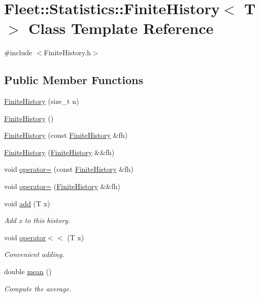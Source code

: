 \hypertarget{class_fleet_1_1_statistics_1_1_finite_history}{}\section{Fleet\+:\+:Statistics\+:\+:Finite\+History$<$ T $>$ Class Template Reference}
\label{class_fleet_1_1_statistics_1_1_finite_history}


{\ttfamily \#include $<$Finite\+History.\+h$>$}

\subsection*{Public Member Functions}
\begin{DoxyCompactItemize}
\item 
\hyperlink{class_fleet_1_1_statistics_1_1_finite_history_a14ef23d9161c620fa8dce3c42ce08220}{Finite\+History} (size\+\_\+t n)
\item 
\hyperlink{class_fleet_1_1_statistics_1_1_finite_history_ae4ca3e409992b855cef8e9430a216481}{Finite\+History} ()
\item 
\hyperlink{class_fleet_1_1_statistics_1_1_finite_history_a7c94246e763c8f3533a5aeecb3d74997}{Finite\+History} (const \hyperlink{class_fleet_1_1_statistics_1_1_finite_history}{Finite\+History} \&fh)
\item 
\hyperlink{class_fleet_1_1_statistics_1_1_finite_history_a60518d678c82115b004bbc8c319e8a63}{Finite\+History} (\hyperlink{class_fleet_1_1_statistics_1_1_finite_history}{Finite\+History} \&\&fh)
\item 
void \hyperlink{class_fleet_1_1_statistics_1_1_finite_history_a68f88a68354e3e420ca350eb6afb94cc}{operator=} (const \hyperlink{class_fleet_1_1_statistics_1_1_finite_history}{Finite\+History} \&fh)
\item 
void \hyperlink{class_fleet_1_1_statistics_1_1_finite_history_a70d3185c2d7a2a00e92cc2680d5db027}{operator=} (\hyperlink{class_fleet_1_1_statistics_1_1_finite_history}{Finite\+History} \&\&fh)
\item 
void \hyperlink{class_fleet_1_1_statistics_1_1_finite_history_a00fd21941d00d71818d6a83c2c7160e5}{add} (T x)
\begin{DoxyCompactList}\small\item\em Add x to this history. \end{DoxyCompactList}\item 
void \hyperlink{class_fleet_1_1_statistics_1_1_finite_history_acee6a049c14cb100dca992444b84d9ec}{operator$<$$<$} (T x)
\begin{DoxyCompactList}\small\item\em Convenient adding. \end{DoxyCompactList}\item 
double \hyperlink{class_fleet_1_1_statistics_1_1_finite_history_a7ece3121889428a4082fbe88fdacc106}{mean} ()
\begin{DoxyCompactList}\small\item\em Compute the average. \end{DoxyCompactList}\end{DoxyCompactItemize}

